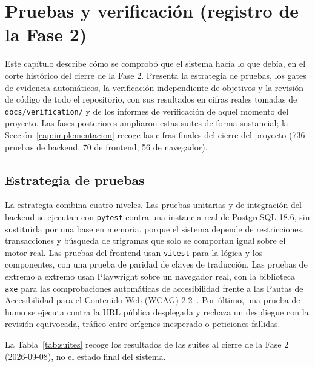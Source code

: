 \chapter{Pruebas y verificación (registro de la Fase 2)}\label{cap:pruebas}

Este capítulo describe cómo se comprobó que el sistema hacía lo que debía, en el corte
histórico del cierre de la Fase 2. Presenta la estrategia de pruebas, los gates de evidencia
automáticos, la verificación independiente de objetivos y la revisión de código de todo el
repositorio, con sus resultados en cifras reales tomadas de \texttt{docs/verification/} y de
los informes de verificación de aquel momento del proyecto. Las fases posteriores ampliaron
estas suites de forma sustancial; la Sección~\ref{cap:implementacion} recoge las cifras
finales del cierre del proyecto (736 pruebas de backend, 70 de frontend, 56 de navegador).

\section{Estrategia de pruebas}\label{sec:pru-estrategia}

La estrategia combina cuatro niveles. Las pruebas unitarias y de integración del backend se
ejecutan con \texttt{pytest} contra una instancia real de PostgreSQL 18.6, sin sustituirla
por una base en memoria, porque el sistema depende de restricciones, transacciones y búsqueda
de trigramas que solo se comportan igual sobre el motor real. Las pruebas del frontend usan
\texttt{vitest} para la lógica y los componentes, con una prueba de paridad de claves de
traducción. Las pruebas de extremo a extremo usan Playwright sobre un navegador real, con la
biblioteca \texttt{axe} para las comprobaciones automáticas de accesibilidad frente a las
Pautas de Accesibilidad para el Contenido Web (WCAG) 2.2~\cite{wcag22}. Por último, una
prueba de humo se ejecuta contra la URL pública desplegada y rechaza un despliegue con la
revisión equivocada, tráfico entre orígenes inesperado o peticiones fallidas.

La Tabla~\ref{tab:suites} recoge los resultados de las suites al cierre de la Fase 2
(2026-09-08), no el estado final del sistema.

